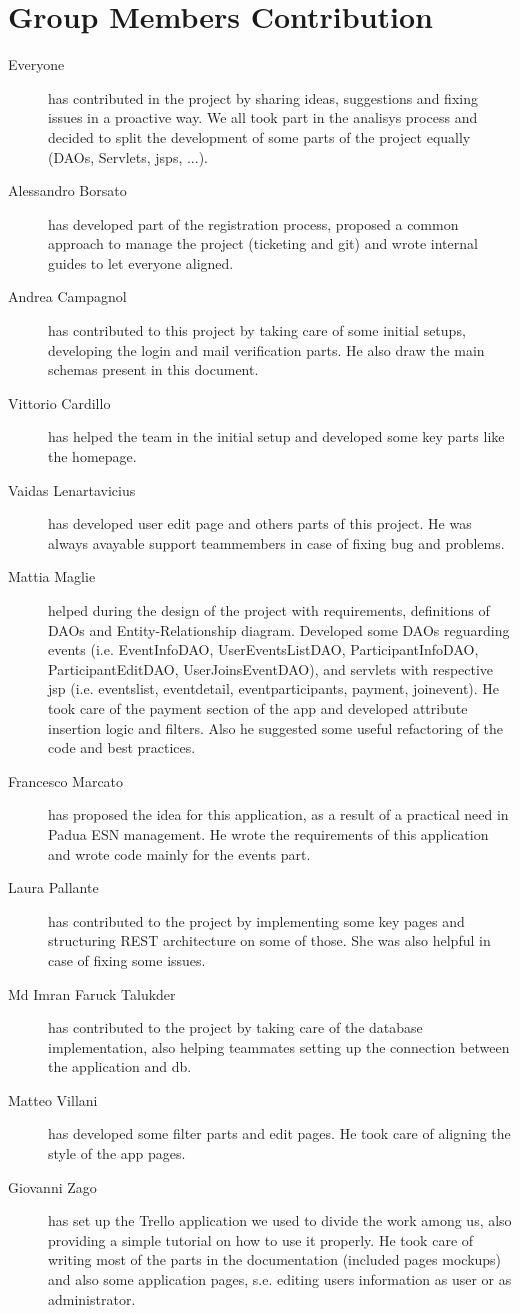 \section{Group Members Contribution}

\begin{description}
    \item[Everyone] has contributed in the project by sharing ideas, suggestions and fixing issues in a proactive way. We all took part in the analisys process and decided to split the development of some parts of the project equally (DAOs, Servlets, jsps, ...).
    \item[Alessandro Borsato] has developed part of the registration process, proposed a common approach to manage the project (ticketing and git) and wrote internal guides to let everyone aligned.
    \item[Andrea Campagnol] has contributed to this project by taking care of some initial setups, developing the login and mail verification parts. He also draw the main schemas present in this document.
    \item[Vittorio Cardillo] has helped the team in the initial setup and developed some key parts like the homepage.
    \item[Vaidas Lenartavicius] has developed user edit page and others parts of this project. He was always avayable support teammembers in case of fixing bug and problems.
    \item[Mattia Maglie] helped during the design of the project with requirements, definitions of DAOs and Entity-Relationship diagram. Developed some DAOs reguarding events (i.e. EventInfoDAO, UserEventsListDAO, ParticipantInfoDAO, ParticipantEditDAO, UserJoinsEventDAO), and servlets with respective jsp (i.e. eventslist, eventdetail, eventparticipants, payment, joinevent). He took care of the payment section of the app and developed attribute insertion logic and filters. Also he suggested some useful refactoring of the code and best practices.
    \item[Francesco Marcato] has proposed the idea for this application, as a result of a practical need in Padua ESN management. He wrote the requirements of this application and wrote code mainly for the events part.
    \item[Laura Pallante] has contributed to the project by implementing some key pages and structuring REST architecture on some of those. She was also helpful in case of fixing some issues.
    \item[Md Imran Faruck Talukder] has contributed to the project by taking care of the database implementation, also helping teammates setting up the connection between the application and db.
    \item[Matteo Villani] has developed some filter parts and edit pages. He took care of aligning the style of the app pages.
    \item[Giovanni Zago] has set up the Trello application we used to divide the work among us, also providing a simple tutorial on how to use it properly. He took care of writing most of the parts in the documentation (included pages mockups) and also some application pages, s.e. editing users information as user or as administrator.
\end{description}